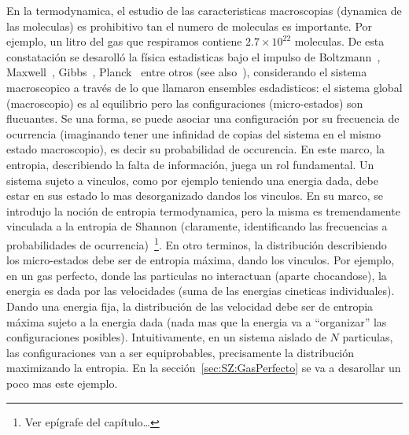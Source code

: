 En la termodynamica, el estudio de las caracteristicas macroscopias (dynamica de
las  moleculas) es prohibitivo  tan el  numero de  moleculas es  importante. Por
ejemplo,  un  litro  del  gas  que  respiramos  contiene  $2.7  \times  10^{22}$
moleculas. De  esta constataci\'on se desaroll\'o la  f\'isica estadisticas bajo
el    impulso    de    Boltzmann~\cite{Bol96,   Bol98},    Maxwell~\cite{Max67},
Gibbs~\cite{Gib02},  Planck~\cite{Pla15}  entre  otros (see  also~\cite{Jay65}),
considerando el  sistema macroscopico  a trav\'es de  lo que  llamaron ensembles
esdadisticos:  el  sistema  global  (macroscopio)  es  al  equilibrio  pero  las
configuraciones (micro-estados)  son flucuantes. Se una forma,  se puede asociar
una  configuraci\'on  por su  frecuencia  de  ocurrencia  (imaginando tener  une
infinidad de  copias del sistema  en el mismo  estado macroscopio), es  decir su
probabilidad de occurencia.   En este marco, la entropia,  describiendo la falta
de informaci\'on, juega un rol  fundamental.  Un sistema sujeto a vinculos, como
por  ejemplo  teniendo  una energia  dada,  debe  estar  en  sus estado  lo  mas
desorganizado dandos  los vinculos.   En su marco,  se introdujo la  noci\'on de
entropia termodynamica, pero  la misma es tremendamente vinculada  a la entropia
de  Shannon  (claramente,  identificando  las frecuencias  a  probabilidades  de
ocurrencia)~\footnote{Ver ep\'igrafe  del cap\'itulo\ldots}.  En  otro terminos,
la distribuci\'on describiendo los  micro-estados debe ser de entropia m\'axima,
dando los  vinculos. Por ejemplo,  en un gas  perfecto, donde las  particulas no
interactuan (aparte chocandose), la energia es dada por las velocidades (suma de
las energias cineticas individuales).  Dando una energia fija, la distribuci\'on
de las  velocidad debe ser de entropia  m\'axima sujeto a la  energia dada (nada
mas  que   la  energia  va   a  ``organizar''  las   configuraciones  posibles).
Intuitivamente, en un sistema aislado de $N$ particulas, las configuraciones van
a ser equiprobables, precisamente la distribuci\'on maximizando la entropia.  En
la  secci\'on~\ref{sec:SZ:GasPerfecto}  se va  a  desarollar  un  poco mas  este
ejemplo.

